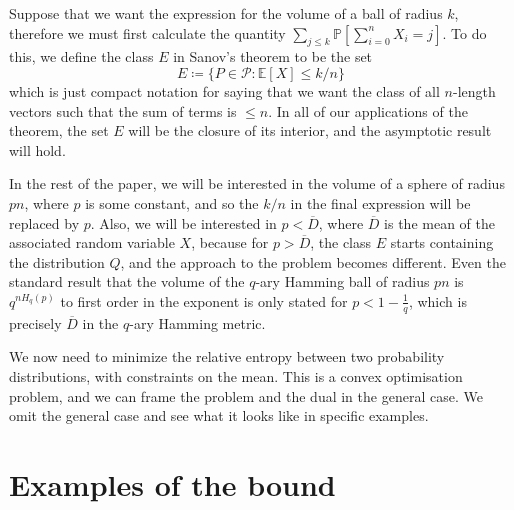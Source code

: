 \documentclass[conference,letterpaper]{IEEEtran}
\begin{document}
Suppose that we want the expression for the volume of a ball of radius $k$, therefore we must first calculate the quantity $\sum_{j \leq k} \mathbb{P}\left[\sum_{i = 0}^{n} X_i = j \right]$.  To do this, we define the class $E$ in Sanov's theorem to be the set 
\begin{equation}
    E \coloneqq \{P \in \mathcal{P} : \mathbb{E}[X] \leq k/n \}
\end{equation}
which is just compact notation for saying that we want the class of all $n$-length vectors such that the sum of terms is $\leq n$. In all of our applications of the theorem, the set $E$ will be the closure of its interior, and the asymptotic result will hold.

In the rest of the paper, we will be interested in the volume of a sphere of radius $pn$, where $p$ is some constant, and so the $k/n$ in the final expression will be replaced by $p$. Also, we will be interested in $p < \overline{D} $, where $\overline{D}$ is the mean of the associated random variable $X$, because for $p > \overline{D}$, the class $E$ starts containing the distribution $Q$, and the approach to the problem becomes different. Even the standard result \cite{Roth:2006:ICT:1137784} that the volume of the $q$-ary Hamming ball of radius $pn$ is $q^{nH_q(p)}$ to first order in the exponent is only stated for $p < 1 - \frac{1}{q}$, which is precisely $\overline{D}$ in the $q$-ary Hamming metric.

We now need to minimize the relative entropy between two probability distributions, with constraints on the mean. This is a convex optimisation problem, and we can frame the problem and the dual in the general case. We omit the general case and see what it looks like in specific examples.

\section{Examples of the bound}\label{examples}
\end{document}

